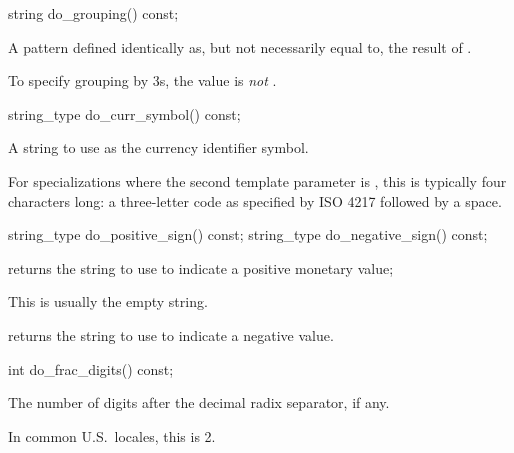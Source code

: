 %
\begin{itemdecl}
string do_grouping() const;
\end{itemdecl}

\begin{itemdescr}
\pnum
\returns
A pattern defined identically as, but not necessarily equal to,
the result of .
\begin{footnote}
To specify grouping by 3s,
the value is  \textit{not} .
\end{footnote}
\end{itemdescr}

%
\begin{itemdecl}
string_type do_curr_symbol() const;
\end{itemdecl}

\begin{itemdescr}
\pnum
\returns
A string to use as the currency identifier symbol.
\begin{note}
For specializations where the second template parameter is ,
this is typically four characters long:
a three-letter code as specified by ISO 4217 followed by a space.
\end{note}
\end{itemdescr}

%
%
\begin{itemdecl}
string_type do_positive_sign() const;
string_type do_negative_sign() const;
\end{itemdecl}

\begin{itemdescr}
\pnum
\returns
{}
returns the string to use to indicate a positive monetary value;
\begin{footnote}
This is usually the empty string.
\end{footnote}
returns the string to use to indicate a negative value.
\end{itemdescr}

%
\begin{itemdecl}
int do_frac_digits() const;
\end{itemdecl}

\begin{itemdescr}
\pnum
\returns
The number of digits after the decimal radix separator, if any.
\begin{footnote}
In common U.S.\ locales, this is 2.
\end{footnote}
\end{itemdescr}

